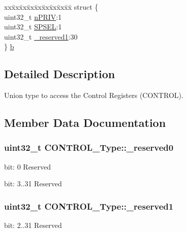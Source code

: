 \begin{DoxyCompactItemize}
\begin{tabbing}
\end{tabbing}\item 
\begin{tabbing}
xx\=xx\=xx\=xx\=xx\=xx\=xx\=xx\=xx\=\kill
struct \{\\
\>uint32\_t \hyperlink{unionCONTROL__Type_a35c1732cf153b7b5c4bd321cf1de9605}{nPRIV}:1\\
\>uint32\_t \hyperlink{unionCONTROL__Type_a8cc085fea1c50a8bd9adea63931ee8e2}{SPSEL}:1\\
\>uint32\_t \hyperlink{unionCONTROL__Type_aa7a5662079a447f801034d108f80ce49}{\_reserved1}:30\\
\} \hyperlink{unionCONTROL__Type_a88c1d6237b6d97c2dc152a22c765dd54}{b}\\

\end{tabbing}\end{DoxyCompactItemize}


\subsection{Detailed Description}
Union type to access the Control Registers (C\+O\+N\+T\+R\+OL). 

\subsection{Member Data Documentation}
\subsubsection[{\texorpdfstring{\+\_\+reserved0}{_reserved0}}]{\setlength{\rightskip}{0pt plus 5cm}uint32\+\_\+t C\+O\+N\+T\+R\+O\+L\+\_\+\+Type\+::\+\_\+reserved0}\hypertarget{unionCONTROL__Type_af8c314273a1e4970a5671bd7f8184f50}{}\label{unionCONTROL__Type_af8c314273a1e4970a5671bd7f8184f50}
bit\+: 0 Reserved

bit\+: 3..31 Reserved 
\subsubsection[{\texorpdfstring{\+\_\+reserved1}{_reserved1}}]{\setlength{\rightskip}{0pt plus 5cm}uint32\+\_\+t C\+O\+N\+T\+R\+O\+L\+\_\+\+Type\+::\+\_\+reserved1}\hypertarget{unionCONTROL__Type_aa7a5662079a447f801034d108f80ce49}{}\label{unionCONTROL__Type_aa7a5662079a447f801034d108f80ce49}
bit\+: 2..31 Reserved 
